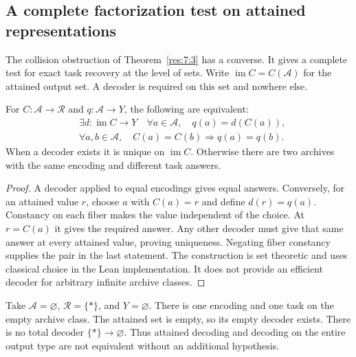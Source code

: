 \subsection{A complete factorization test on attained representations}
\label{sec:attained-recovery}

The collision obstruction of Theorem~\ref{res:7:3} has a converse. It gives a complete test for exact task recovery at the level of sets. Write $\operatorname{im}C=C(\mathscr A)$ for the attained output set. A decoder is required on this set and nowhere else.

\begin{theorem}
\label{res:new:factorization}
For $C:\mathscr A\to\mathcal R$ and $q:\mathscr A\to Y$, the following are equivalent:
\[
\begin{aligned}
 &\exists d:\operatorname{im}C\to Y\quad
       \forall a\in\mathscr A,\quad q(a)=d(C(a)),\\
 &\forall a,b\in\mathscr A,\quad C(a)=C(b)\Longrightarrow q(a)=q(b).
\end{aligned}
\]
When a decoder exists it is unique on $\operatorname{im}C$. Otherwise there are two archives with the same encoding and different task answers.
\end{theorem}
\begin{proof}
A decoder applied to equal encodings gives equal answers. Conversely, for an attained value $r$, choose $a$ with $C(a)=r$ and define $d(r)=q(a)$. Constancy on each fiber makes the value independent of the choice. At $r=C(a)$ it gives the required answer. Any other decoder must give that same answer at every attained value, proving uniqueness. Negating fiber constancy supplies the pair in the last statement. The construction is set theoretic and uses classical choice in the Lean implementation. It does not provide an efficient decoder for arbitrary infinite archive classes.
\end{proof}

\begin{example}
\label{res:new:empty-decoder}
Take $\mathscr A=\varnothing$, $\mathcal R=\{*\}$, and $Y=\varnothing$. There is one encoding and one task on the empty archive class. The attained set is empty, so its empty decoder exists. There is no total decoder $\{*\}\to\varnothing$. Thus attained decoding and decoding on the entire output type are not equivalent without an additional hypothesis.
\end{example}

